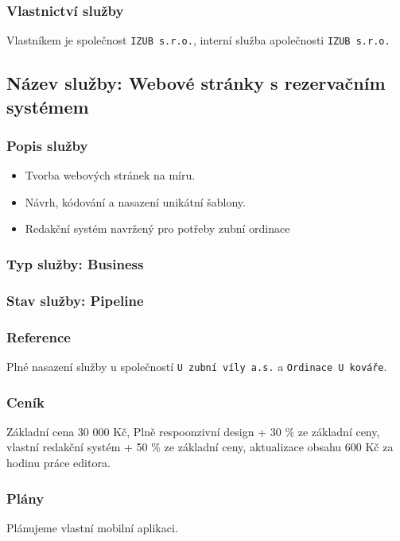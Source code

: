 \documentclass[11pt, a4paper, titlepage]{article}
\begin{document}
	\subsubsection*{Vlastnictví služby}

	Vlastníkem je společnost \texttt{IZUB s.r.o.}, interní služba apolečnosti \texttt{IZUB s.r.o.}

	\subsection*{Název služby: Webové stránky s rezervačním systémem}

	\subsubsection*{Popis služby}
	\begin{itemize}
		\item Tvorba webových stránek na míru.
		\item Návrh, kódování a nasazení unikátní šablony.
		\item Redakční systém navržený pro potřeby zubní ordinace
	\end{itemize}

	\subsubsection*{Typ služby:  Business}

	\subsubsection*{Stav služby: Pipeline}

	\subsubsection*{Reference}
	Plné nasazení služby u společností \texttt{U zubní víly a.s.} a \texttt{Ordinace U kováře}.

	\subsubsection*{Ceník}
	Základní cena 30 000 Kč, Plně respoonzivní design + 30 \% ze základní ceny, vlastní redakční systém + 50 \% ze základní ceny, aktualizace obsahu 600 Kč za hodinu práce editora.

	\subsubsection*{Plány}
	Plánujeme vlastní mobilní aplikaci.
\end{document}
